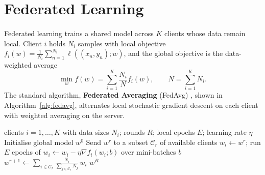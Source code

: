 \documentclass[12pt,a4paper,final]{extreport}
\begin{document}
\section{Federated Learning}

\paragraph{} Federated learning trains a shared model across $K$ clients whose data remain local. Client $i$ holds $N_i$ samples with local objective $f_i(w)=\frac{1}{N_i}\sum_{n=1}^{N_i}\ell((x_n,y_n);w)$, and the global objective is the data-weighted average \cite{p4}
\begin{equation}
\min_{w}f(w)=\sum_{i=1}^{K}\frac{N_i}{N}f_i(w),\qquad N=\sum_{i=1}^{K}N_i.
\label{eq:flobj}
\end{equation}
The standard algorithm, \textbf{Federated Averaging} (FedAvg) \cite{mcmahan2017}, shown in Algorithm~\ref{alg:fedavg}, alternates local stochastic gradient descent on each client with weighted averaging on the server.

\begin{algorithm}[htbp]
\caption{Federated Averaging (FedAvg)}\label{alg:fedavg}
\begin{algorithmic}[1]
\Require clients $i=1,\dots,K$ with data sizes $N_i$; rounds $R$; local epochs $E$; learning rate $\eta$
\State Initialise global model $w^{0}$
  \State Send $w^{r}$ to a subset $\mathcal{C}_r$ of available clients
    \State $w_i\gets w^{r}$; run $E$ epochs of $w_i\gets w_i-\eta\nabla f_i(w_i;b)$ over mini-batches $b$
  \EndFor
  \State $w^{r+1}\gets\sum_{i\in\mathcal{C}_r}\frac{N_i}{\sum_{j\in\mathcal{C}_r}N_j}\,w_i$
\EndFor
\State \Return $w^{R}$
\end{algorithmic}
\end{algorithm}
\end{document}
